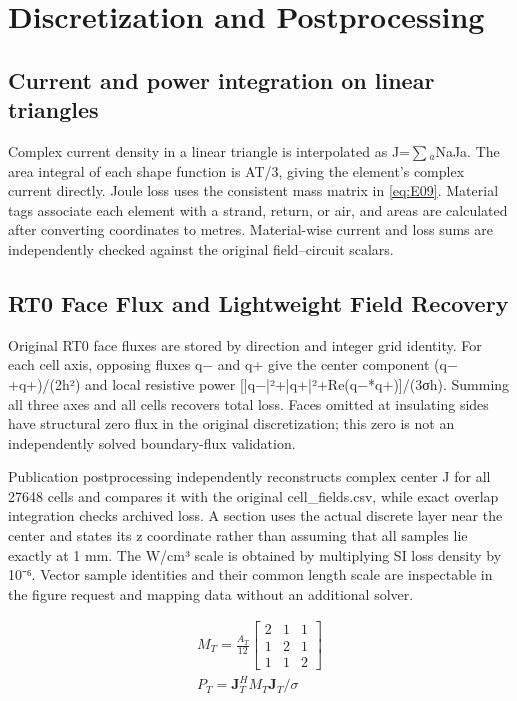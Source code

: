 \section{Discretization and Postprocessing}
\label{chapter:B}

\hypertarget{B.triangle_derivation.heading}{}
\subsection{Current and power integration on linear triangles}

\hypertarget{B.triangle_derivation.p1}{}
Complex current density in a linear triangle is interpolated as J=\(\sum\)\(_a\)NaJa. The area integral of each shape function is AT/3, giving the element's complex current directly. Joule loss uses the consistent mass matrix in \eqref{eq:E09}. Material tags associate each element with a strand, return, or air, and areas are calculated after converting coordinates to metres. Material-wise current and loss sums are independently checked against the original field–circuit scalars.

\hypertarget{B.report_rt0.heading}{}
\subsection{RT0 Face Flux and Lightweight Field Recovery}

\hypertarget{B.report_rt0.p1}{}
Original RT0 face fluxes are stored by direction and integer grid identity. For each cell axis, opposing fluxes q− and q+ give the center component (q−+q+)/(2h²) and local resistive power [|q−|²+|q+|²+Re(q−*q+)]/(3σh). Summing all three axes and all cells recovers total loss. Faces omitted at insulating sides have structural zero flux in the original discretization; this zero is not an independently solved boundary-flux validation.

\hypertarget{B.report_rt0.p2}{}
Publication postprocessing independently reconstructs complex center J for all 27648 cells and compares it with the original cell\_fields.csv, while exact overlap integration checks archived loss. A section uses the actual discrete layer near the center and states its z coordinate rather than assuming that all samples lie exactly at 1 mm. The W/cm³ scale is obtained by multiplying SI loss density by 10⁻⁶. Vector sample identities and their common length scale are inspectable in the figure request and mapping data without an additional solver.

\hypertarget{B.equation.E09}{}
\hypertarget{E09}{}
\begin{equation}
\begin{gathered}
M_T=\frac{A_T}{12}\begin{bmatrix}2&1&1\\1&2&1\\1&1&2\end{bmatrix} \\
P_T=\mathbf J_T^H M_T\mathbf J_T/\sigma
\end{gathered}
\tag{9}\label{eq:E09}
\end{equation}

